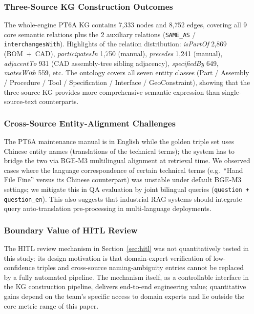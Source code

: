 \documentclass[applsci,article,submit,pdftex,moreauthors]{Definitions/mdpi}
\begin{document}
\subsubsection{Three-Source KG Construction Outcomes}

The whole-engine PT6A KG contains 7{,}333 nodes and 8{,}752 edges, covering all 9 core semantic relations plus the 2 auxiliary relations (\texttt{SAME\_AS} / \texttt{interchangesWith}). Highlights of the relation distribution: \textit{isPartOf} 2{,}869 (BOM~+~CAD), \textit{participatesIn} 1{,}750 (manual), \textit{precedes} 1{,}241 (manual), \textit{adjacentTo} 931 (CAD assembly-tree sibling adjacency), \textit{specifiedBy} 649, \textit{matesWith} 559, etc. The ontology covers all seven entity classes (Part / Assembly / Procedure / Tool / Specification / Interface / GeoConstraint), showing that the three-source KG provides more comprehensive semantic expression than single-source-text counterparts.

\subsubsection{Cross-Source Entity-Alignment Challenges}

The PT6A maintenance manual is in English while the golden triple set uses Chinese entity names (translations of the technical terms); the system has to bridge the two via BGE-M3 multilingual alignment at retrieval time. We observed cases where the language correspondence of certain technical terms (e.g.\ ``Hand File Fine'' versus its Chinese counterpart) was unstable under default BGE-M3 settings; we mitigate this in QA evaluation by joint bilingual queries (\texttt{question + question\_en}). This also suggests that industrial RAG systems should integrate query auto-translation pre-processing in multi-language deployments.

\subsubsection{Boundary Value of HITL Review}

The HITL review mechanism in Section~\ref{sec:hitl} was not quantitatively tested in this study; its design motivation is that domain-expert verification of low-confidence triples and cross-source naming-ambiguity entries cannot be replaced by a fully automated pipeline. The mechanism itself, as a controllable interface in the KG construction pipeline, delivers end-to-end engineering value; quantitative gains depend on the team's specific access to domain experts and lie outside the core metric range of this paper.
\end{document}
